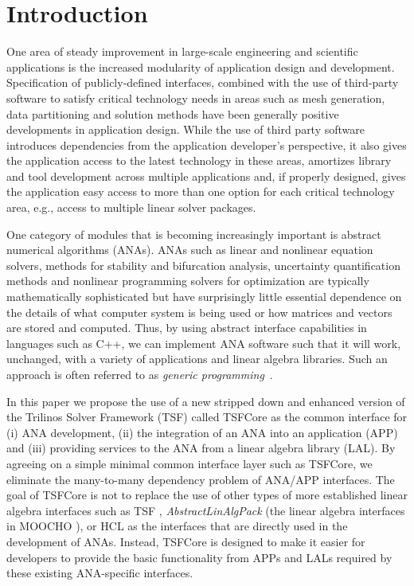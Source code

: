 \section{Introduction}

One area of steady improvement in large-scale engineering and
scientific applications is the increased modularity of application
design and development.  Specification of publicly-defined interfaces,
combined with the use of third-party software to satisfy critical
technology needs in areas such as mesh generation, data partitioning
and solution methods have been generally positive developments in
application design.  While the use of third party software introduces
dependencies from the application developer's perspective, it also
gives the application access to the latest technology in these areas,
amortizes library and tool development across multiple applications
and, if properly designed, gives the application easy access to more
than one option for each critical technology area, e.g., access to
multiple linear solver packages.

One category of modules that is becoming increasingly important is
abstract numerical algorithms (ANAs).  ANAs such as linear and
nonlinear equation solvers, methods for stability and bifurcation
analysis, uncertainty quantification methods and nonlinear programming
solvers for optimization are typically mathematically sophisticated
but have surprisingly little essential dependence on the details of
what computer system is being used or how matrices and vectors are
stored and computed.  Thus, by using abstract interface capabilities
in languages such as C++, we can implement ANA software such that it
will work, unchanged, with a variety of applications and linear
algebra libraries.  Such an approach is often referred to as {\it
generic programming}~\cite{ref:boost_generic_programming}.

In this paper we propose the use of a new stripped down and enhanced
version of the Trilinos Solver Framework (TSF) called TSFCore as the
common interface for (i) ANA development, (ii) the integration of an
ANA into an application (APP) and (iii) providing services to the ANA
from a linear algebra library (LAL).  By agreeing on a simple minimal
common interface layer such as TSFCore, we eliminate the many-to-many
dependency problem of ANA/APP interfaces.  The goal of TSFCore is not
to replace the use of other types of more established linear algebra
interfaces such as TSF {}\cite{ref:TSF}, {}\textit{AbstractLinAlgPack}
(the linear algebra interfaces in MOOCHO
{}\cite{ref:moochouserguide}), or HCL {}\cite{ref:hcl} as the
interfaces that are directly used in the development of ANAs.
Instead, TSFCore is designed to make it easier for developers to
provide the basic functionality from APPs and LALs required by these
existing ANA-specific interfaces.

